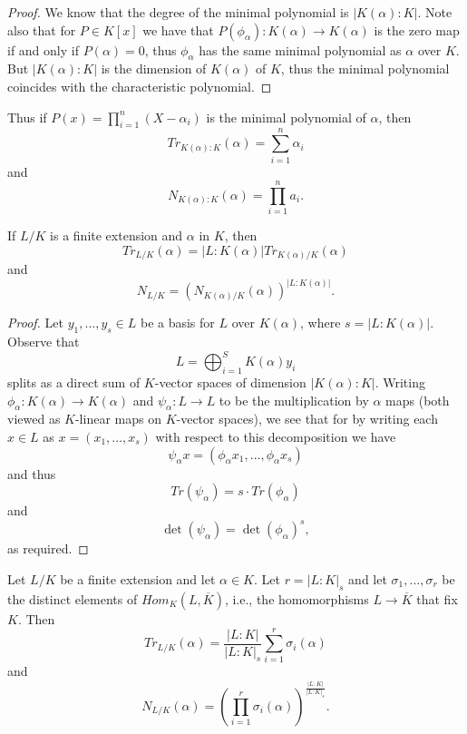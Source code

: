 \documentclass[twoside, a4paper, 10pt]{amsart}
\begin{document}
\begin{proof} We know that the degree of the minimal polynomial is $|K(\alpha):K|$. Note also that for $P \in K[x]$ we have that $P(\phi_{\alpha}):K(\alpha) \to K(\alpha)$ is the zero map if and only if $P(\alpha) = 0$, thus $\phi_{\alpha}$ has the same minimal polynomial as $\alpha$ over $K$. But $|K(\alpha):K|$ is the dimension of $K(\alpha)$ of $K$, thus the minimal polynomial coincides with the characteristic polynomial.\end{proof}

Thus if $P(x) = \prod_{i=1}^n (X - \alpha_i)$ is the minimal polynomial of $\alpha$, then $$Tr_{K(\alpha):K}(\alpha) = \sum_{i=1}^n \alpha_i$$ and $$N_{K(\alpha):K}(\alpha) = \prod_{i=1}^n a_i.$$


\begin{prop} If $L/K$ is a finite extension and $\alpha$ in $K$, then $$Tr_{L/K}(\alpha) = |L:K(\alpha)| Tr_{K(\alpha)/K} (\alpha)$$ and $$N_{L/K} = \left( N_{K(\alpha)/K}(\alpha) \right)^{|L:K(\alpha)|}.$$

\end{prop}

\begin{proof} Let $y_1, \ldots, y_s \in L$ be a basis for $L$ over $K(\alpha)$, where $s = |L:K(\alpha)|$. Observe that $$L = \bigoplus_{i=1}^S K(\alpha) y_i$$ splits as a direct sum of $K$-vector spaces of dimension $|K(\alpha):K|$. Writing $\phi_{\alpha}:K(\alpha) \to K(\alpha)$ and $\psi_{\alpha}:L \to L$ to be the multiplication by $\alpha$ maps (both viewed as $K$-linear maps on $K$-vector spaces), we see that for by writing each $x \in L$ as $x = (x_1, \ldots, x_s)$ with respect to this decomposition we have $$\psi_{\alpha} x = (\phi_{\alpha} x_1, \ldots, \phi_{\alpha} x_s)$$ and thus $$Tr (\psi_{\alpha}) = s \cdot Tr (\phi_{\alpha})$$ and $$\operatorname{det} (\psi_{\alpha}) = \operatorname{det} (\phi_{\alpha})^s,$$ as required. \end{proof}

\begin{thm} Let $L/K$ be a finite extension and let $\alpha \in K$. Let $r=|L:K|_s$ and let $\sigma_1, \ldots, \sigma_r$ be the distinct elements of $Hom_K(L, \overline{K})$, i.e., the homomorphisms $L \to \overline{K}$ that fix $K$. Then $$Tr_{L/K}(\alpha) = \frac{|L:K|}{|L:K|_s} \sum_{i=1}^r \sigma_i (\alpha)$$ and $$N_{L/K}(\alpha) = \left(\prod_{i=1}^r \sigma_i (\alpha) \right ) ^{\frac{|L:K|}{|L:K|_s}}.$$

\end{thm}
\end{document}

